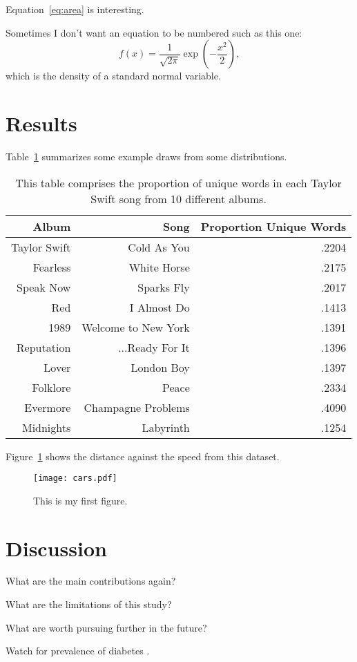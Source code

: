 \documentclass[12pt]{article}
\begin{document}
Equation~\eqref{eq:area} is interesting. 

Sometimes I don't want an equation to be numbered such as this one:
\[
  f(x) = \frac{1}{\sqrt{2\pi}} \exp\left( - \frac{x^2}{2} \right),
\]
which is the density of a standard normal variable.



\section{Results}
\label{sec:resu}

Table~\ref{tab:rv} summarizes some example draws from some distributions.

\begin{table}[tbp]
  \caption{This table comprises the proportion of unique words in each Taylor Swift song from 10 different albums.}
  \label{tab:rv}
\centering
\begin{tabular}{rrr}
  \toprule
Album & Song & Proportion Unique Words \\ 
  \midrule
Taylor Swift & Cold As You & .2204 \\ 
  Fearless & White Horse & .2175 \\ 
  Speak Now & Sparks Fly & .2017 \\ 
  Red & I Almost Do & .1413 \\ 
  1989 & Welcome to New York & .1391 \\ 
  Reputation & ...Ready For It & .1396 \\ 
  Lover & London Boy & .1397 \\ 
  Folklore & Peace & .2334 \\ 
  Evermore & Champagne Problems & .4090 \\ 
  Midnights & Labyrinth & .1254 \\ 
   \bottomrule
\end{tabular}
\end{table}

Figure~\ref{fig:cars} shows the distance against the speed from this dataset.


\begin{figure}[tbp]
  \centering
  \texttt{[image: cars.pdf]}
  \caption{This is my first figure.}
  \label{fig:cars}
\end{figure}

\section{Discussion}
\label{sec:disc}

What are the main contributions again?

What are the limitations of this study?

What are worth pursuing further in the future?

\lipsum[1-2]
Watch for prevalence of diabetes \citep{wild2004global}.



\end{document}
